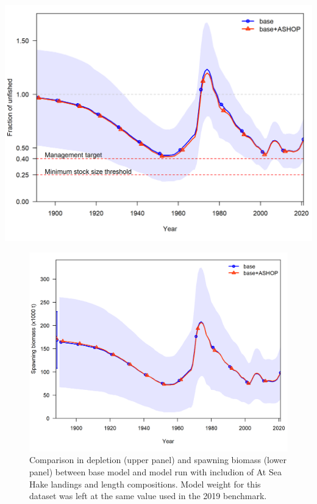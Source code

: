 \documentclass[11pt,
  english,
  a4paper,
]{article}
\begin{document}
\tagmcend\tagstructend


\includegraphics[width=1\textwidth,height=1\textheight]{figs/ashop_sens_depl.png}

\tagmcend\tagstructend


\begin{figure}
\centering
\includegraphics[width=1\textwidth,height=1\textheight]{figs/ashop_sens_ssb.png}
\caption{Comparison in depletion (upper panel) and spawning biomass (lower panel) between base model and model run with includion of At Sea Hake landings and length compositions. Model weight for this dataset was left at the same value used in the 2019 benchmark. \label{fig:ASHOP}}
\end{figure}
\end{document}
